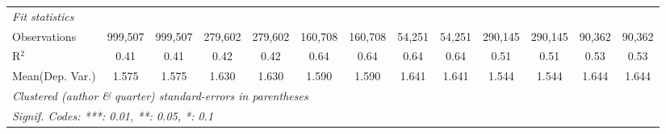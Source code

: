 \begin{tabular}{lcccccccccccc}
   \midrule
   \emph{Fit statistics}\\
   Observations                             & 999,507       & 999,507  & 279,602       & 279,602  & 160,708      & 160,708         & 54,251        & 54,251        & 290,145        & 290,145      & 90,362        & 90,362\\  
   R$^2$                                    & 0.41          & 0.41     & 0.42          & 0.42     & 0.64         & 0.64            & 0.64          & 0.64          & 0.51           & 0.51         & 0.53          & 0.53\\  
Mean(Dep. Var.) & 1.575 & 1.575 & 1.630 & 1.630 & 1.590 & 1.590 & 1.641 & 1.641 & 1.544 & 1.544 & 1.644 & 1.644 \\
   \midrule \midrule
   \multicolumn{13}{l}{\emph{Clustered (author \& quarter) standard-errors in parentheses}}\\
   \multicolumn{13}{l}{\emph{Signif. Codes: ***: 0.01, **: 0.05, *: 0.1}}\\
\end{tabular}
\par\endgroup
